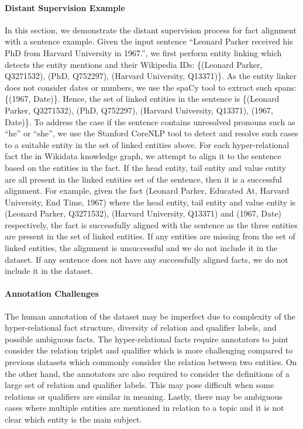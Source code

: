 \documentclass[11pt]{article}
\begin{document}
\paragraph{Distant Supervision Example}
In this section, we demonstrate the distant supervision process for fact alignment with a sentence example.
Given the input sentence ``Leonard Parker received his PhD from Harvard University in 1967.'', we first perform entity linking which detects the entity mentions and their Wikipedia IDs: \{(Leonard Parker, Q3271532), (PhD, Q752297), (Harvard University, Q13371)\}.
As the entity linker does not consider dates or numbers, we use the spaCy tool to extract such spans: \{(1967, Date)\}.
Hence, the set of linked entities in the sentence is \{(Leonard Parker, Q3271532), (PhD, Q752297), (Harvard University, Q13371), (1967, Date)\}.
To address the case if the sentence contains unresolved pronouns such as ``he'' or ``she'', we use the Stanford CoreNLP tool to detect and resolve such cases to a suitable entity in the set of linked entities above.
For each hyper-relational fact the in Wikidata knowledge graph, we attempt to align it to the sentence based on the entities in the fact.
If the head entity, tail entity and value entity are all present in the linked entities set of the sentence, then it is a successful alignment.
For example, given the fact (Leonard Parker, Educated At, Harvard University, End Time, 1967) where the head entity, tail entity and value entity is (Leonard Parker, Q3271532), (Harvard University, Q13371) and (1967, Date) respectively, the fact is successfully aligned with the sentence as the three entities are present in the set of linked entities.
If any entities are missing from the set of linked entities, the alignment is unsuccessful and we do not include it in the dataset.
If any sentence does not have any successfully aligned facts, we do not include it in the dataset.

\paragraph{Annotation Challenges}
The human annotation of the dataset may be imperfect due to complexity of the hyper-relational fact structure, diversity of relation and qualifier labels, and possible ambiguous facts.
The hyper-relational facts require annotators to joint consider the relation triplet and qualifier which is more challenging compared to previous datasets which commonly consider the relation between two entities.
On the other hand, the annotators are also required to consider the definitions of a large set of relation and qualifier labels. 
This may pose difficult when some relations or qualifiers are similar in meaning.
Lastly, there may be ambiguous cases where multiple entities are mentioned in relation to a topic and it is not clear which entity is the main subject.
\end{document}
